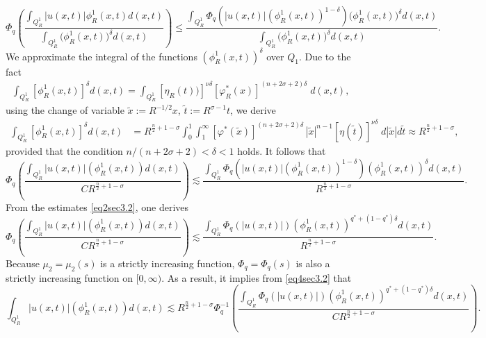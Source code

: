 \documentclass[11pt,reqno]{amsart}
\newcommand{\tron}[1]{\left( #1 \right)}
\numberwithin{equation}{section}
\newcommand{\dps}{\displaystyle}
\theoremstyle{plain}
\begin{document}
$$
\Phi_q\left(\dfrac{\dps\int_{Q^1_{R}}|u(x, t)|\phi^1_R(x, t) d(x, t)}{\dps\int_{Q^1_{R}}\big(\phi^1_R(x,t)\big)^{\delta} d(x, t)}\right) \leq \dfrac{\dps\int_{Q^1_{R}} \Phi_q\left(|u(x, t)|\left(\phi^1_R(x, t)\right)^{1-\delta}\right)\big(\phi^1_R(x,t)\big)^{\delta}d(x, t)}{\dps\int_{Q^1_{R}}\big(\phi^1_R(x,t)\big)^{\delta}d(x, t)}.
$$
We approximate the integral of the functions $\tron{\phi^1_{R}(x,t)}^{\delta}$ over $Q_1$. Due to the fact
\begin{equation}\label{eq5sec3.1}
\begin{aligned}
    \int_{Q^1_{R}}[\phi^1_R(x,t)]^{\delta}d(x, t)=\int_{Q^1_{R}}[\eta_{R}(t))]^{\nu\delta}\left[\varphi^*_R(x)\right]^{(n+2\sigma+2)\delta}\;d(x,t),
\end{aligned}
\end{equation}
using the change of variable $\tilde{x}:=R^{-1/2}x$, $\tilde{t}:=R^{\sigma-1}t$, we derive
\begin{equation}\label{eq6sec3.1}
\begin{aligned}
\int_{Q^1_{R}}[\phi^1_R(x,t)]^{\delta}d(x, t)&=R^{\frac{n}{2}+1-\sigma}\int_{0}^{1}\int_{1}^{\infty}[\varphi^* (\tilde{x})]^{(n+2\sigma+2)\delta}\,|\tilde{x}|^{n-1}[\eta(\tilde{t})]^{\nu\delta}\;d|\tilde{x}| d\tilde{t} \approx R^{\frac{n}{2}+1-\sigma},
\end{aligned}
\end{equation} 
provided that the condition $n/(n+2\sigma+2)<\delta<1$ holds. It follows that
\begin{equation}\label{es2}
\Phi_q\left(\frac{\dps\int_{Q^1_{R}}|u(x, t)|\left(\phi^1_R(x, t)\right)  d(x, t)}{CR^{\frac{n}{2}+1-\sigma}}\right) \lesssim \frac{\dps\int_{Q^1_{R}} \Phi_q\left(|u(x, t)|\left(\phi^1_R(x, t)\right)^{1-\delta}\right)\tron{\phi^1_R(x,t)}^{\delta} d(x, t)}{R^{\frac{n}{2}+1-\sigma}}.
\end{equation}
From the estimates \eqref{eq2sec3.2}, one derives
\begin{equation}\label{eq4sec3.2}
\Phi_q\left(\frac{\dps\int_{Q^1_{R}}|u(x, t)|\left(\phi^1_R(x, t)\right)   d(x, t)}{CR^{\frac{n}{2}+1-\sigma}}\right) \lesssim \frac{\dps\int_{Q^1_{R}} \Phi_q(|u(x, t)|)\left(\phi^1_R(x, t)\right)^{q^*+(1-q^*)\delta}d(x, t)}{R^{\frac{n}{2}+1-\sigma}}.
\end{equation}
Because $\mu_2=\mu_2(s)$ is a strictly increasing function, $\Phi_q=\Phi_q(s)$ is also a strictly increasing function on $[0, \infty)$. As a result, it implies from \eqref{eq4sec3.2} that
\begin{equation}\label{eq5sec3.2}
\int_{Q^1_{R}}|u(x, t)|\left(\phi^1_R(x, t)\right) d(x, t)\lesssim R^{\frac{n}{2}+1-\sigma} \Phi_q^{-1}\left(\frac{\dps\int_{Q^1_{R}} \Phi_q(|u(x, t)|)\left(\phi^1_R(x, t)\right)^{q^*+(1-q^*)\delta} d(x,t)}{CR^{\frac{n}{2}+1-\sigma}}\right).
\end{equation}
\end{document}
